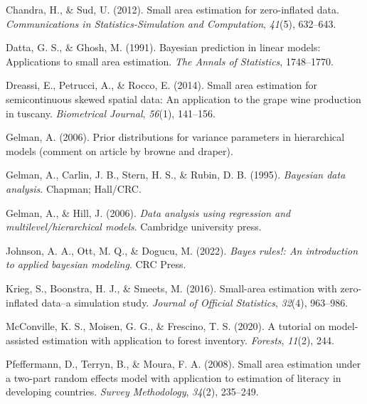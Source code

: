 \documentclass[12pt,twoside]{reedthesis}
\newlength{\cslhangindent}
\newenvironment{CSLReferences}[2] %
 {%
  \setlength{\parindent}{0pt}
  \ifodd #1 \everypar{\setlength{\hangindent}{\cslhangindent}}\ignorespaces\fi
  \ifnum #2 > 0
  \setlength{\parskip}{#2\baselineskip}
  \fi
 }%
 {}
\begin{document}
\hypertarget{refs}{}
\begin{CSLReferences}{1}{0}
\leavevmode{}%
Chandra, H., \& Sud, U. (2012). Small area estimation for zero-inflated data. \emph{Communications in Statistics-Simulation and Computation}, \emph{41}(5), 632--643.

\leavevmode{}%
Datta, G. S., \& Ghosh, M. (1991). Bayesian prediction in linear models: Applications to small area estimation. \emph{The Annals of Statistics}, 1748--1770.

\leavevmode{}%
Dreassi, E., Petrucci, A., \& Rocco, E. (2014). Small area estimation for semicontinuous skewed spatial data: An application to the grape wine production in tuscany. \emph{Biometrical Journal}, \emph{56}(1), 141--156.

\leavevmode{}%
Gelman, A. (2006). Prior distributions for variance parameters in hierarchical models (comment on article by browne and draper).

\leavevmode{}%
Gelman, A., Carlin, J. B., Stern, H. S., \& Rubin, D. B. (1995). \emph{Bayesian data analysis}. Chapman; Hall/CRC.

\leavevmode{}%
Gelman, A., \& Hill, J. (2006). \emph{Data analysis using regression and multilevel/hierarchical models}. Cambridge university press.

\leavevmode{}%
Johnson, A. A., Ott, M. Q., \& Dogucu, M. (2022). \emph{Bayes rules!: An introduction to applied bayesian modeling}. CRC Press.

\leavevmode{}%
Krieg, S., Boonstra, H. J., \& Smeets, M. (2016). Small-area estimation with zero-inflated data--a simulation study. \emph{Journal of Official Statistics}, \emph{32}(4), 963--986.

\leavevmode{}%
McConville, K. S., Moisen, G. G., \& Frescino, T. S. (2020). A tutorial on model-assisted estimation with application to forest inventory. \emph{Forests}, \emph{11}(2), 244.

\leavevmode{}%
Pfeffermann, D., Terryn, B., \& Moura, F. A. (2008). Small area estimation under a two-part random effects model with application to estimation of literacy in developing countries. \emph{Survey Methodology}, \emph{34}(2), 235--249.


\end{CSLReferences}
\end{document}
